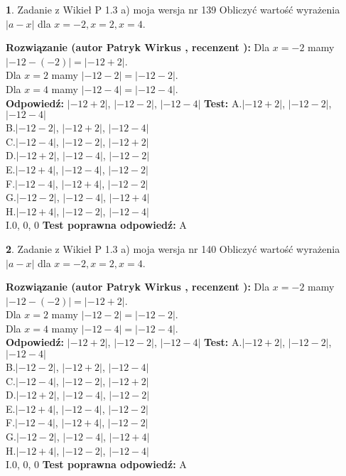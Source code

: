 \documentclass[12pt, a4paper]{article}
\theoremstyle{definition} %
\newtheorem{zad}{}
\newcommand{\zadStart}[1]{\begin{zad}#1\newline}
\newcommand{\zadStop}{\end{zad}}
\newcommand{\rozwStart}[2]{\noindent \textbf{Rozwiązanie (autor #1 , recenzent #2): }\newline}
\newcommand{\rozwStop}{\newline}
\newcommand{\odpStart}{\noindent \textbf{Odpowiedź:}\newline}
\newcommand{\odpStop}{\newline}
\newcommand{\testStart}{\noindent \textbf{Test:}\newline}
\newcommand{\testStop}{\newline}
\newcommand{\kluczStart}{\noindent \textbf{Test poprawna odpowiedź:}\newline}
\newcommand{\kluczStop}{\newline}
\begin{document}
\zadStart{Zadanie z Wikieł P 1.3 a) moja wersja nr 139}
Obliczyć wartość wyrażenia $|a - x|$ dla $x=-2,x=2,x=4$.
\zadStop
\rozwStart{Patryk Wirkus}{}
Dla $x = -2$ mamy $|-12 - (-2)| = |-12 + 2|$.\\
Dla $x = 2$ mamy $|-12 - 2| = |-12 - 2|$.\\
Dla $x = 4$ mamy $|-12 - 4| = |-12 - 4|$.\\
\rozwStop
\odpStart
$|-12 + 2|$, $|-12 - 2|$, $|-12 - 4|$
\odpStop
\testStart
A.$|-12 + 2|$, $|-12 - 2|$, $|-12 - 4|$\\
B.$|-12 - 2|$, $|-12 + 2|$, $|-12 - 4|$\\
C.$|-12 - 4|$, $|-12 - 2|$, $|-12 + 2|$\\
D.$|-12 + 2|$, $|-12 - 4|$, $|-12 - 2|$\\
E.$|-12 + 4|$, $|-12 - 4|$, $|-12 - 2|$\\
F.$|-12 - 4|$, $|-12 + 4|$, $|-12 - 2|$\\
G.$|-12 - 2|$, $|-12 - 4|$, $|-12 + 4|$\\
H.$|-12 + 4|$, $|-12 - 2|$, $|-12 - 4|$\\
I.$0$, $0$, $0$
\testStop
\kluczStart
A
\kluczStop



\zadStart{Zadanie z Wikieł P 1.3 a) moja wersja nr 140}
Obliczyć wartość wyrażenia $|a - x|$ dla $x=-2,x=2,x=4$.
\zadStop
\rozwStart{Patryk Wirkus}{}
Dla $x = -2$ mamy $|-12 - (-2)| = |-12 + 2|$.\\
Dla $x = 2$ mamy $|-12 - 2| = |-12 - 2|$.\\
Dla $x = 4$ mamy $|-12 - 4| = |-12 - 4|$.\\
\rozwStop
\odpStart
$|-12 + 2|$, $|-12 - 2|$, $|-12 - 4|$
\odpStop
\testStart
A.$|-12 + 2|$, $|-12 - 2|$, $|-12 - 4|$\\
B.$|-12 - 2|$, $|-12 + 2|$, $|-12 - 4|$\\
C.$|-12 - 4|$, $|-12 - 2|$, $|-12 + 2|$\\
D.$|-12 + 2|$, $|-12 - 4|$, $|-12 - 2|$\\
E.$|-12 + 4|$, $|-12 - 4|$, $|-12 - 2|$\\
F.$|-12 - 4|$, $|-12 + 4|$, $|-12 - 2|$\\
G.$|-12 - 2|$, $|-12 - 4|$, $|-12 + 4|$\\
H.$|-12 + 4|$, $|-12 - 2|$, $|-12 - 4|$\\
I.$0$, $0$, $0$
\testStop
\kluczStart
A
\kluczStop
\end{document}

